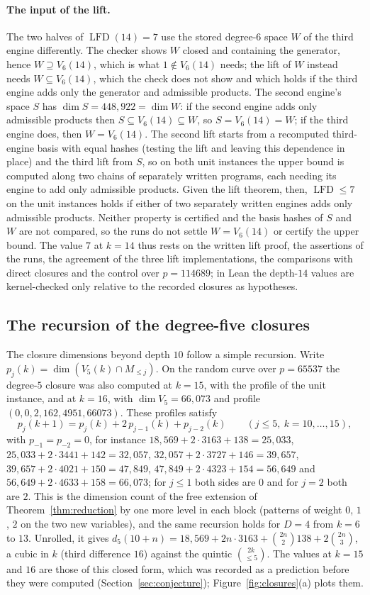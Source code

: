 \documentclass[11pt]{article}
\theoremstyle{definition}\newtheorem{definition}[theorem]{Definition}
\theoremstyle{remark}\newtheorem{remark}[theorem]{Remark}
\newcommand{\lfd}{\operatorname{LFD}}
\begin{document}
\paragraph{The input of the lift.}
The two halves of $\lfd(14)=7$ use the stored degree-$6$ space $W$ of the
third engine differently. The checker shows $W$ closed and containing the
generator, hence $W\supseteq V_6(14)$, which is what $1\notin V_6(14)$ needs;
the lift of $W$ instead needs $W\subseteq V_6(14)$, which the check does not
show and which holds if the third engine adds only the generator and
admissible products. The second engine's space $S$ has
$\dim S=448{,}922=\dim W$: if the second engine adds only admissible products
then $S\subseteq V_6(14)\subseteq W$, so $S=V_6(14)=W$; if the third engine
does, then $W=V_6(14)$. The second lift starts from a recomputed third-engine
basis with equal hashes (testing the lift and leaving this dependence in
place) and the third lift from $S$, so on both unit instances the upper bound
is computed along two chains of separately written programs, each needing its
engine to add only admissible products. Given the lift theorem, then,
$\lfd\le7$ on the unit instances holds if either of two separately written
engines adds only admissible products. Neither property is certified and the
basis hashes of $S$ and $W$ are not compared, so the runs do not settle
$W=V_6(14)$ or certify the upper bound. The value $7$ at $k=14$ thus rests on
the written lift proof, the assertions of the runs, the agreement of the
three lift implementations, the comparisons with direct closures and the
control over $p=114689$; in Lean the depth-$14$ values are kernel-checked
only relative to the recorded closures as hypotheses.

\subsection{The recursion of the degree-five closures}\label{sec:recursion}
The closure dimensions beyond depth $10$ follow a simple recursion. Write
$p_j(k)=\dim(V_5(k)\cap M_{\le j})$. On the random curve over $p=65537$ the
degree-$5$ closure was also computed at $k=15$, with the profile of the unit
instance, and at $k=16$, with $\dim V_5=66{,}073$ and profile
$(0,0,2,162,4951,66073)$. These profiles satisfy
\[
 p_j(k+1)=p_j(k)+2\,p_{j-1}(k)+p_{j-2}(k)\qquad(j\le5,\ k=10,\ldots,15),
\]
with $p_{-1}=p_{-2}=0$, for instance $18{,}569+2\cdot3163+138=25{,}033$,
$25{,}033+2\cdot3441+142=32{,}057$, $32{,}057+2\cdot3727+146=39{,}657$,
$39{,}657+2\cdot4021+150=47{,}849$, $47{,}849+2\cdot4323+154=56{,}649$ and
$56{,}649+2\cdot4633+158=66{,}073$; for $j\le1$ both sides are $0$ and for
$j=2$ both are $2$. This is the dimension count of the free extension of
Theorem~\ref{thm:reduction} by one more level in each block (patterns of
weight $0$, $1$, $2$ on the two new variables), and the same recursion holds
for $D=4$ from $k=6$ to $13$. Unrolled, it gives
$d_5(10+n)=18{,}569+2n\cdot3163+\binom{2n}{2}138+2\binom{2n}{3}$, a cubic
in $k$ (third difference $16$) against the quintic $\binom{2k}{\le5}$. The
values at $k=15$ and $16$ are those of this closed form, which was recorded
as a prediction before they were computed (Section~\ref{sec:conjecture});
Figure~\ref{fig:closures}(a) plots them.
\end{document}

